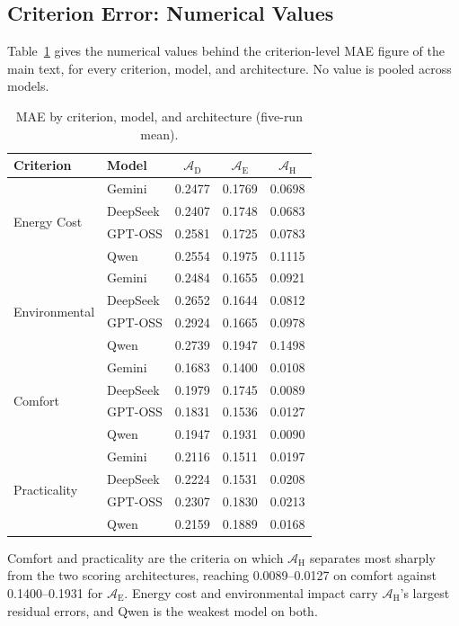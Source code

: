 \documentclass[11pt]{article}
\begin{document}
\subsection{Criterion Error: Numerical Values}
\label{app:criterion_mae}

Table~\ref{tab:mae_by_criterion} gives the numerical values behind the criterion-level MAE figure of the main text, for every criterion, model, and architecture. No value is pooled across models.

\begin{table}[htbp]
\centering
\caption{MAE by criterion, model, and architecture (five-run mean).}
\label{tab:mae_by_criterion}
\begin{tabular}{@{}l l ccc@{}}
\toprule
Criterion & Model & $\mathcal{A}_{\text{D}}$ & $\mathcal{A}_{\text{E}}$ & $\mathcal{A}_{\text{H}}$ \\
\midrule
\multirow{4}{*}{Energy Cost}
 & Gemini   & 0.2477 & 0.1769 & 0.0698 \\
 & DeepSeek & 0.2407 & 0.1748 & 0.0683 \\
 & GPT-OSS  & 0.2581 & 0.1725 & 0.0783 \\
 & Qwen     & 0.2554 & 0.1975 & 0.1115 \\
\midrule
\multirow{4}{*}{Environmental}
 & Gemini   & 0.2484 & 0.1655 & 0.0921 \\
 & DeepSeek & 0.2652 & 0.1644 & 0.0812 \\
 & GPT-OSS  & 0.2924 & 0.1665 & 0.0978 \\
 & Qwen     & 0.2739 & 0.1947 & 0.1498 \\
\midrule
\multirow{4}{*}{Comfort}
 & Gemini   & 0.1683 & 0.1400 & 0.0108 \\
 & DeepSeek & 0.1979 & 0.1745 & 0.0089 \\
 & GPT-OSS  & 0.1831 & 0.1536 & 0.0127 \\
 & Qwen     & 0.1947 & 0.1931 & 0.0090 \\
\midrule
\multirow{4}{*}{Practicality}
 & Gemini   & 0.2116 & 0.1511 & 0.0197 \\
 & DeepSeek & 0.2224 & 0.1531 & 0.0208 \\
 & GPT-OSS  & 0.2307 & 0.1830 & 0.0213 \\
 & Qwen     & 0.2159 & 0.1889 & 0.0168 \\
\bottomrule
\end{tabular}
\end{table}

Comfort and practicality are the criteria on which $\mathcal{A}_{\text{H}}$ separates most sharply from the two scoring architectures, reaching 0.0089--0.0127 on comfort against 0.1400--0.1931 for $\mathcal{A}_{\text{E}}$. Energy cost and environmental impact carry $\mathcal{A}_{\text{H}}$'s largest residual errors, and Qwen is the weakest model on both.
\end{document}
